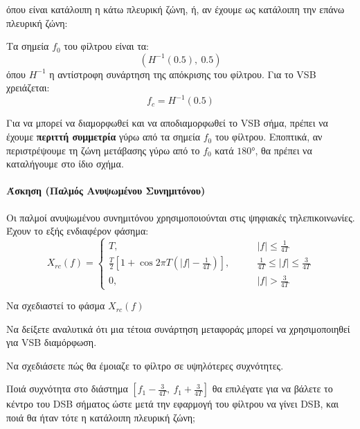 \documentclass[11pt,a4paper,notitlepage,fleqn,final]{article}
\begin{document}
όπου είναι κατάλοιπη η κάτω πλευρική ζώνη, ή, αν έχουμε ως κατάλοιπη την επάνω πλευρική
ζώνη:


Τα σημεία \( f_0 \) του φίλτρου είναι τα:
\[
\left( H^{-1}(0.5), \ 0.5 \right)
\]
όπου \( H^{-1} \) η αντίστροφη συνάρτηση της απόκρισης του φίλτρου. Για το VSB χρειάζεται:
\[
f_c = H^{-1}(0.5)
\]

Για να μπορεί να διαμορφωθεί και να αποδιαμορφωθεί το VSB σήμα, πρέπει να έχουμε \textbf{περιττή συμμετρία} γύρω από τα σημεία \( f_0 \) του φίλτρου. Εποπτικά, αν περιστρέψουμε τη ζώνη μετάβασης γύρω από το \( f_0 \) κατά \( \ang{180} \), θα πρέπει
να καταλήγουμε στο ίδιο σχήμα.

\paragraph{Άσκηση (Παλμός Ανυψωμένου Συνημιτόνου)}
Οι παλμοί ανυψωμένου συνημιτόνου χρησιμοποιούνται στις ψηφιακές τηλεπικοινωνίες. Έχουν
το εξής ενδιαφέρον φάσημα:
\[
X_{rc}(f) = \begin{cases}
T, \qquad & |f| \leq \frac{1}{4T}\\
\frac{T}{2}\left[1+\cos2πT\left(|f|-\frac{1}{4T}\right)\right],\qquad & \frac{1}{4T} \leq |f| \leq \frac{3}{4T}\\
0,\qquad & |f| > \frac{3}{4T}
\end{cases}
\]

\begin{enumgreekparen}
	\item Να σχεδιαστεί το φάσμα \( X_{rc}(f) \)
	\item Να δείξετε αναλυτικά ότι μια τέτοια συνάρτηση μεταφοράς μπορεί να χρησιμοποιηθεί
	για VSB διαμόρφωση.
	\item Να σχεδιάσετε πώς θα έμοιαζε το φίλτρο σε υψηλότερες συχνότητες.
	\item Ποιά συχνότητα στο διάστημα \( \left[ f_1-\frac{3}{4T},\
	f_1+\frac{3}{4T} \right] \) θα επιλέγατε για να βάλετε το κέντρο του DSB σήματος
	ώστε μετά την εφαρμογή του φίλτρου να γίνει DSB, και ποιά θα ήταν τότε η κατάλοιπη πλευρική ζώνη;
\end{enumgreekparen}
\end{document}
